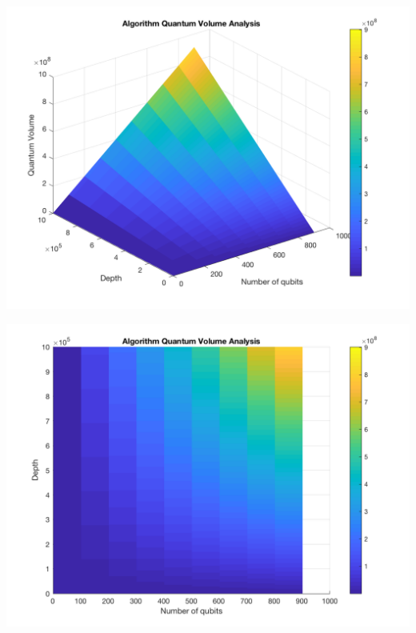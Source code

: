 \begin{itemize}
\begin{itemize}
\begin{itemize}
\begin{minipage}{.45\textwidth}
\begin{center}
\includegraphics[width=.9\linewidth]{figures/V_q_analysis_mult2.png}
\end{center}

\label{fig:algorithmmultQV2}

\end{minipage}%
\hspace{1cm}
\begin{minipage}{.45\textwidth}

\begin{center}
\includegraphics[width=.9\linewidth]{figures/V_q_analysis_mult1.png}
\end{center}

\label{fig:algorithmmultQV1}

\end{minipage}%


\end{itemize}
\end{itemize}
\end{itemize}
